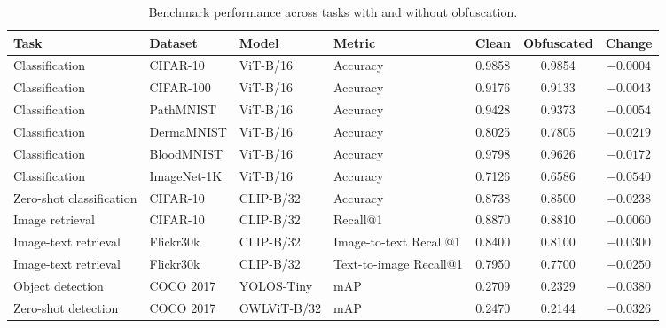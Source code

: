 \documentclass{ieeeaccess}
\newcommand{\rev}[1]{{\color{green}#1}}
\begin{document}
\begin{table}[t]
\centering
\caption{\rev{Benchmark performance across tasks with and without obfuscation.}}
\label{tab:performance}
\scriptsize
\setlength{\tabcolsep}{3pt}
\begin{tabular}{p{} p{} p{} p{} c c c}
\toprule
\rev{\textbf{Task}} & \rev{\textbf{Dataset}} & \rev{\textbf{Model}} & \rev{\textbf{Metric}} & \rev{\textbf{Clean}} & \rev{\textbf{Obfuscated}} & \rev{\textbf{Change}} \\
\midrule
\rev{Classification} & \rev{CIFAR-10} & \rev{ViT-B/16} & \rev{Accuracy} & \rev{0.9858} & \rev{0.9854} & \rev{$-0.0004$} \\
\rev{Classification} & \rev{CIFAR-100} & \rev{ViT-B/16} & \rev{Accuracy} & \rev{0.9176} & \rev{0.9133} & \rev{$-0.0043$} \\
\rev{Classification} & \rev{PathMNIST} & \rev{ViT-B/16} & \rev{Accuracy} & \rev{0.9428} & \rev{0.9373} & \rev{$-0.0054$} \\
\rev{Classification} & \rev{DermaMNIST} & \rev{ViT-B/16} & \rev{Accuracy} & \rev{0.8025} & \rev{0.7805} & \rev{$-0.0219$} \\
\rev{Classification} & \rev{BloodMNIST} & \rev{ViT-B/16} & \rev{Accuracy} & \rev{0.9798} & \rev{0.9626} & \rev{$-0.0172$} \\
\rev{Classification} & \rev{ImageNet-1K} & \rev{ViT-B/16} & \rev{Accuracy} & \rev{0.7126} & \rev{0.6586} & \rev{$-0.0540$} \\
\midrule
\rev{Zero-shot classification} & \rev{CIFAR-10} & \rev{CLIP-B/32} & \rev{Accuracy} & \rev{0.8738} & \rev{0.8500} & \rev{$-0.0238$} \\
\rev{Image retrieval} & \rev{CIFAR-10} & \rev{CLIP-B/32} & \rev{Recall@1} & \rev{0.8870} & \rev{0.8810} & \rev{$-0.0060$} \\
\rev{Image-text retrieval} & \rev{Flickr30k} & \rev{CLIP-B/32} & \rev{Image-to-text Recall@1} & \rev{0.8400} & \rev{0.8100} & \rev{$-0.0300$} \\
\rev{Image-text retrieval} & \rev{Flickr30k} & \rev{CLIP-B/32} & \rev{Text-to-image Recall@1} & \rev{0.7950} & \rev{0.7700} & \rev{$-0.0250$} \\
\midrule
\rev{Object detection} & \rev{COCO 2017} & \rev{YOLOS-Tiny} & \rev{mAP} & \rev{0.2709} & \rev{0.2329} & \rev{$-0.0380$} \\
\rev{Zero-shot detection} & \rev{COCO 2017} & \rev{OWLViT-B/32} & \rev{mAP} & \rev{0.2470} & \rev{0.2144} & \rev{$-0.0326$} \\

\end{tabular}
\end{table}
\end{document}
